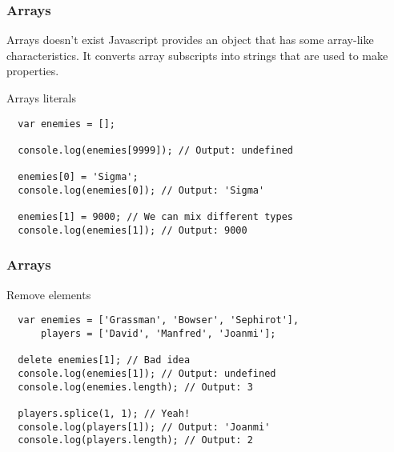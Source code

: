 \begin{frame}[fragile]
  \frametitle{Arrays}

  \begin{block}{Arrays doesn't exist}
  Javascript provides an object that has some array-like characteristics. It converts array subscripts into strings that are used to make properties.
  \end{block}

  \pause

  \begin{block}{Arrays literals}
  {\scriptsize
  \begin{verbatim}
  var enemies = [];

  console.log(enemies[9999]); // Output: undefined

  enemies[0] = 'Sigma';
  console.log(enemies[0]); // Output: 'Sigma'

  enemies[1] = 9000; // We can mix different types
  console.log(enemies[1]); // Output: 9000

  \end{verbatim}
  }
  \end{block}
\end{frame}

\begin{frame}[fragile]
  \frametitle{Arrays}

  \begin{block}{Remove elements}
  {\scriptsize
  \begin{verbatim}
  var enemies = ['Grassman', 'Bowser', 'Sephirot'],
      players = ['David', 'Manfred', 'Joanmi'];

  delete enemies[1]; // Bad idea
  console.log(enemies[1]); // Output: undefined
  console.log(enemies.length); // Output: 3

  players.splice(1, 1); // Yeah!
  console.log(players[1]); // Output: 'Joanmi'
  console.log(players.length); // Output: 2
  \end{verbatim}
  }
  \end{block}
\end{frame}
